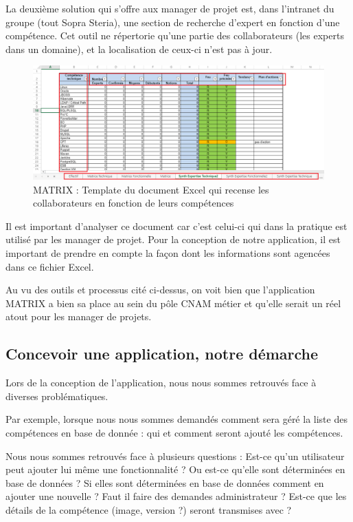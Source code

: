 La deuxième solution qui s'offre aux manager de projet est, dans l'intranet du groupe (tout Sopra Steria), une section de recherche d'expert en fonction d'une compétence. Cet outil ne répertorie qu'une partie des collaborateurs (les experts dans un domaine), et la localisation de ceux-ci n'est pas à jour.

\begin{figure}[!h]
\centering
\includegraphics[width=1\textwidth]{images/MATRIX-excel.png}
\caption{MATRIX : Template du document Excel qui recense les collaborateurs en fonction de leurs compétences}
\end{figure}

Il est important d'analyser ce document car c'est celui-ci qui dans la pratique est utilisé par les manager de projet. Pour la conception de notre application, il est important de prendre en compte la façon dont les informations sont agencées dans ce fichier Excel.

Au vu des outils et processus cité ci-dessus, on voit bien que l'application MATRIX a bien sa place au sein du pôle CNAM métier et qu'elle serait un réel atout pour les manager de projets.

\subsection{Concevoir une application, notre démarche}

Lors de la conception de l'application, nous nous sommes retrouvés face à diverses problématiques. 

Par exemple, lorsque nous nous sommes demandés comment sera géré la liste des compétences en base de donnée : qui et comment seront ajouté les compétences.

Nous nous sommes retrouvés face à plusieurs questions : Est-ce qu'un utilisateur peut ajouter lui même une fonctionnalité ? Ou est-ce qu'elle sont déterminées en base de données ? Si elles sont déterminées en base de données comment en ajouter une nouvelle ? Faut il faire des demandes administrateur ? Est-ce que les détails de la compétence (image, version ?) seront transmises avec ?

